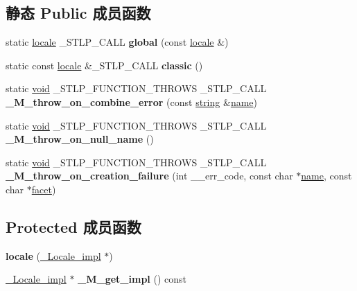 \subsection*{静态 Public 成员函数}
\begin{DoxyCompactItemize}
\item 
\mbox{\label{classlocale_a2407f95c1b3d64b7210ca447b10d3762}} 
static \hyperlink{classlocale}{locale} \+\_\+\+S\+T\+L\+P\+\_\+\+C\+A\+LL {\bfseries global} (const \hyperlink{classlocale}{locale} \&)
\item 
\mbox{\label{classlocale_ad12eed272c295c2472cbd5070d6ff0f1}} 
static const \hyperlink{classlocale}{locale} \&\+\_\+\+S\+T\+L\+P\+\_\+\+C\+A\+LL {\bfseries classic} ()
\item 
\mbox{\label{classlocale_ac87c6d3974d5732adb5e8fa29d218fcf}} 
static \hyperlink{interfacevoid}{void} \+\_\+\+S\+T\+L\+P\+\_\+\+F\+U\+N\+C\+T\+I\+O\+N\+\_\+\+T\+H\+R\+O\+WS \+\_\+\+S\+T\+L\+P\+\_\+\+C\+A\+LL {\bfseries \+\_\+\+M\+\_\+throw\+\_\+on\+\_\+combine\+\_\+error} (const \hyperlink{structstring}{string} \&\hyperlink{structname}{name})
\item 
\mbox{\label{classlocale_a084fcb2906411c101a59fdff99593011}} 
static \hyperlink{interfacevoid}{void} \+\_\+\+S\+T\+L\+P\+\_\+\+F\+U\+N\+C\+T\+I\+O\+N\+\_\+\+T\+H\+R\+O\+WS \+\_\+\+S\+T\+L\+P\+\_\+\+C\+A\+LL {\bfseries \+\_\+\+M\+\_\+throw\+\_\+on\+\_\+null\+\_\+name} ()
\item 
\mbox{\label{classlocale_a3d81df7e740c1074818de217f1d19ef0}} 
static \hyperlink{interfacevoid}{void} \+\_\+\+S\+T\+L\+P\+\_\+\+F\+U\+N\+C\+T\+I\+O\+N\+\_\+\+T\+H\+R\+O\+WS \+\_\+\+S\+T\+L\+P\+\_\+\+C\+A\+LL {\bfseries \+\_\+\+M\+\_\+throw\+\_\+on\+\_\+creation\+\_\+failure} (int \+\_\+\+\_\+err\+\_\+code, const char $\ast$\hyperlink{structname}{name}, const char $\ast$\hyperlink{classlocale_1_1facet}{facet})
\end{DoxyCompactItemize}
\subsection*{Protected 成员函数}
\begin{DoxyCompactItemize}
\item 
\mbox{\label{classlocale_a6c96dd6e1cd58b8e3634c9e7e7936943}} 
{\bfseries locale} (\hyperlink{class___locale__impl}{\+\_\+\+Locale\+\_\+impl} $\ast$)
\item 
\mbox{\label{classlocale_a14e9789bb5a6e06be693b25390d6f90a}} 
\hyperlink{class___locale__impl}{\+\_\+\+Locale\+\_\+impl} $\ast$ {\bfseries \+\_\+\+M\+\_\+get\+\_\+impl} () const
\end{DoxyCompactItemize}
